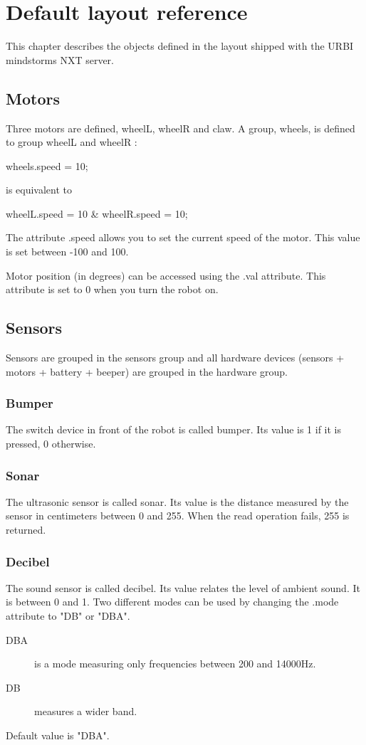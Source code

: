 \section{Default layout reference}

This chapter describes the objects defined in the  layout
shipped with the URBI mindstorms NXT server.
\subsection{Motors}
Three motors are defined, wheelL, wheelR and claw.
A group, wheels, is defined to group wheelL and wheelR :
\begin{urbiunchecked}
  wheels.speed = 10;
\end{urbiunchecked}

is equivalent to
\begin{urbiunchecked}
  wheelL.speed = 10 & wheelR.speed = 10;
\end{urbiunchecked}

The attribute .speed allows you to set the current speed of the motor. This
value is set between -100 and 100.

Motor position (in degrees) can be accessed using the .val attribute. This
attribute is set to 0 when you turn the robot on.

\subsection{Sensors}
Sensors are grouped in the sensors group and all hardware devices (sensors +
motors + battery + beeper) are grouped in the hardware group.
\subsubsection{Bumper}
The switch device in front of the robot is called bumper. Its value is 1 if it
is pressed, 0 otherwise.
\subsubsection{Sonar}
The ultrasonic sensor is called sonar.
Its value is the distance measured by the sensor in centimeters between 0 and
255. When the read operation fails, 255 is returned.
\subsubsection{Decibel}
The sound sensor is called decibel.
Its value relates the level of ambient sound. It is between 0 and 1.
Two different modes can be used by changing the .mode attribute to "DB" or
"DBA".
\begin{description}
\item[DBA] is a mode measuring only frequencies between 200 and 14000Hz.
\item[DB] measures a wider band.
\end{description}
Default value is "DBA".

